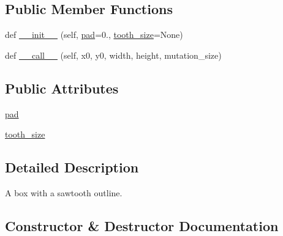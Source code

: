\subsection*{Public Member Functions}
\begin{DoxyCompactItemize}
\item 
def \hyperlink{classmatplotlib_1_1patches_1_1BoxStyle_1_1Sawtooth_a1167395e20fd15d4855c1653082031c5}{\+\_\+\+\_\+init\+\_\+\+\_\+} (self, \hyperlink{classmatplotlib_1_1patches_1_1BoxStyle_1_1Sawtooth_afe4db8943cc12e93a29849b6c525185d}{pad}=0., \hyperlink{classmatplotlib_1_1patches_1_1BoxStyle_1_1Sawtooth_ac2b7b3677d1e1d1143781641eef42b59}{tooth\+\_\+size}=None)
\item 
def \hyperlink{classmatplotlib_1_1patches_1_1BoxStyle_1_1Sawtooth_a49e23af14c9b1b57812650fe787c54d7}{\+\_\+\+\_\+call\+\_\+\+\_\+} (self, x0, y0, width, height, mutation\+\_\+size)
\end{DoxyCompactItemize}
\subsection*{Public Attributes}
\begin{DoxyCompactItemize}
\item 
\hyperlink{classmatplotlib_1_1patches_1_1BoxStyle_1_1Sawtooth_afe4db8943cc12e93a29849b6c525185d}{pad}
\item 
\hyperlink{classmatplotlib_1_1patches_1_1BoxStyle_1_1Sawtooth_ac2b7b3677d1e1d1143781641eef42b59}{tooth\+\_\+size}
\end{DoxyCompactItemize}


\subsection{Detailed Description}
\begin{DoxyVerb}A box with a sawtooth outline.\end{DoxyVerb}
 

\subsection{Constructor \& Destructor Documentation}
\mbox{\label{classmatplotlib_1_1patches_1_1BoxStyle_1_1Sawtooth_a1167395e20fd15d4855c1653082031c5}} 
